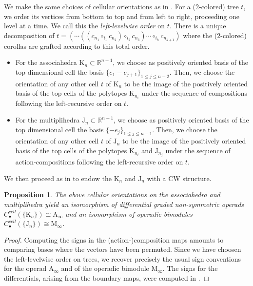 \documentclass[twoside, 12pt]{amsart}
\newtheorem{proposition}[definition]{Proposition}
\theoremstyle{remark}
\newcommand{\RR}{\mathbb{R}}
\newcommand{\K}{\mathrm{K}}
\newcommand{\J}{\mathrm{J}}
\newcommand{\Minf}{\mathrm{M}_\infty} %
\begin{document}
We make the same choices of cellular orientations as in \cite[I, Section 4]{Mazuir21}. For a (2-colored) tree $t$, we order its vertices from bottom to top and from left to right, proceeding one level at a time. We call this the \emph{left-levelwise order} on $t$. There is a unique decomposition of $t=(\cdots ((c_{n_1} \circ_{i_1} c_{n_2})\circ_{i_2}c_{n_3})\cdots \circ_{i_k} c_{n_{k+1}})$ where the (2-colored) corollas are grafted according to this total order. 
\begin{itemize}
  \item For the associahedra $\K_n \subset \RR^{n-1}$, we choose as positively oriented basis of the top dimensional cell the basis $\{e_1 - e_{j+1}\}_{1\leq j \leq n-2}$. Then, we choose the orientation of any other cell $t$ of $\K_n$ to be the image of the positively oriented basis of the top cells of the polytopes $\K_{n_i}$ under the sequence of compositions following the left-recursive order on $t$. 
  \item For the multiplihedra $\J_n \subset \RR^{n-1}$, we choose as positively oriented basis of the top dimensional cell the basis $\{- e_j\}_{1\leq j \leq n-1}$. Then, we choose the orientation of any other cell $t$ of $\J_n$ to be the image of the positively oriented basis of the top cells of the polytopes $\K_{n_i}$ and $\J_{n_j}$ under the sequence of action-compositions following the left-recursive order on $t$.
\end{itemize}

We then proceed as in \cite[Proposition 4.22]{LA21} to endow the $\K_n$ and $\J_n$ with a CW structure. 

\begin{proposition} 
\label{prop:functoriality}
The above cellular orientations on the associahedra and multiplihedra yield an isomorphism of differential graded non-symmetric operads $C_\bullet^{cell}(\{\K_n\})\cong \mathrm{A}_\infty$ and an isomorphism of operadic bimodules $C_\bullet^{cell}(\{\J_n\})\cong \Minf$. 
\end{proposition}

\begin{proof}
Computing the signs in the (action-)composition maps amounts to comparing bases where the vectors have been permuted. Since we have choosen the left-levelwise order on trees, we recover precisely the usual sign conventions for the operad $\mathrm{A}_\infty$ and of the operadic bimodule $\Minf$.
The signs for the differentials, arising from the boundary maps, were computed in \cite[I, Section 4]{Mazuir21}.
\end{proof}
\end{document}

